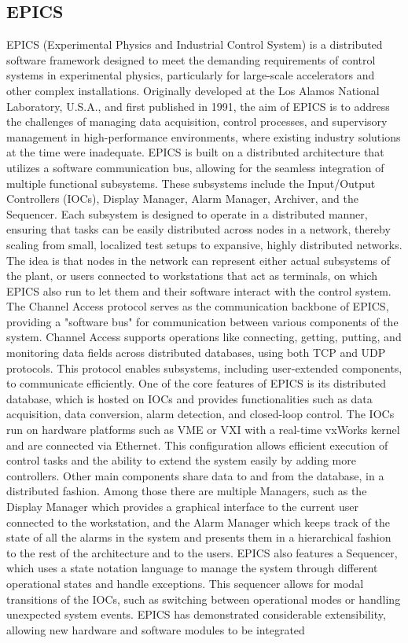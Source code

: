 \subsection{EPICS}
\label{sec:related_work_epics}
EPICS (Experimental Physics and Industrial Control System) \cite{dalesio_epics_1991,epics_controls_epics_nodate} is a distributed software framework designed to meet the demanding requirements of control systems in experimental physics, particularly for large-scale accelerators and other complex installations. Originally developed at the Los Alamos National Laboratory, U.S.A., and first published in 1991, the aim of EPICS is to address the challenges of managing data acquisition, control processes, and supervisory management in high-performance environments, where existing industry solutions at the time were inadequate. EPICS is built on a distributed architecture that utilizes a software communication bus, allowing for the seamless integration of multiple functional subsystems. These subsystems include the Input/Output Controllers (IOCs), Display Manager, Alarm Manager, Archiver, and the Sequencer. Each subsystem is designed to operate in a distributed manner, ensuring that tasks can be easily distributed across nodes in a network, thereby scaling from small, localized test setups to expansive, highly distributed networks. The idea is that nodes in the network can represent either actual subsystems of the plant, or users connected to workstations that act as terminals, on which EPICS also run to let them and their software interact with the control system. The Channel Access protocol serves as the communication backbone of EPICS, providing a "software bus" for communication between various components of the system. Channel Access supports operations like connecting, getting, putting, and monitoring data fields across distributed databases, using both TCP and UDP protocols. This protocol enables subsystems, including user-extended components, to communicate efficiently. One of the core features of EPICS is its distributed database, which is hosted on IOCs and provides functionalities such as data acquisition, data conversion, alarm detection, and closed-loop control. The IOCs run on hardware platforms such as VME or VXI with a real-time vxWorks kernel and are connected via Ethernet. This configuration allows efficient execution of control tasks and the ability to extend the system easily by adding more controllers. Other main components share data to and from the database, in a distributed fashion. Among those there are multiple Managers, such as the Display Manager which provides a graphical interface to the current user connected to the workstation, and the Alarm Manager which keeps track of the state of all the alarms in the system and presents them in a hierarchical fashion to the rest of the architecture and to the users. EPICS also features a Sequencer, which uses a state notation language to manage the system through different operational states and handle exceptions. This sequencer allows for modal transitions of the IOCs, such as switching between operational modes or handling unexpected system events. EPICS has demonstrated considerable extensibility, allowing new hardware and software modules to be integrated 